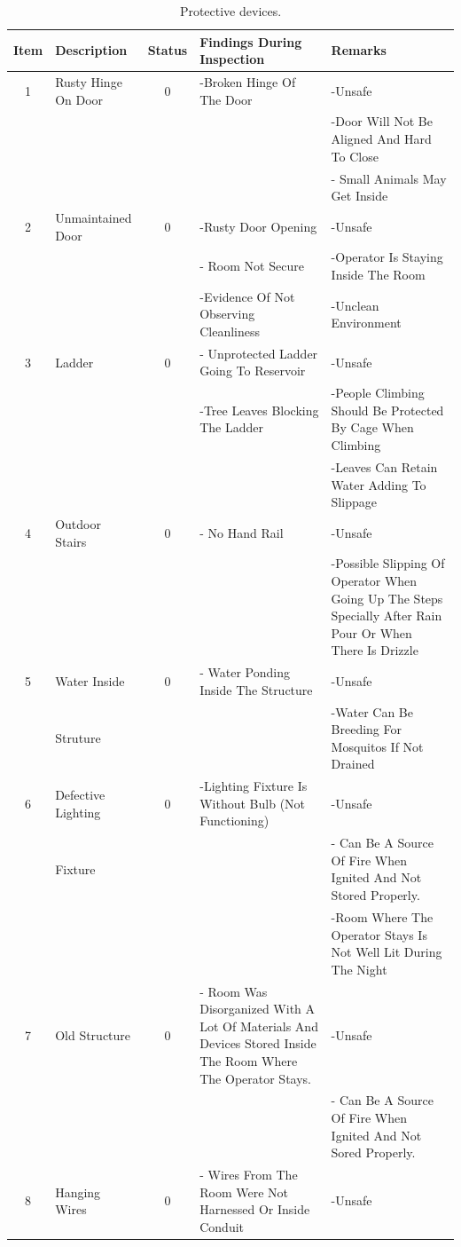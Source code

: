 \begin{table}[!htb]
	\caption{Protective devices.}
	\label{ch05_tbl_fdassafe02}
	{\scriptsize
\begin{tabular}{c|p{1.5cm}|c|p{5cm}|p{5cm}}
	\hline
	Item & Description & Status & Findings During Inspection & Remarks \\ 
	\hline
	1 & Rusty Hinge On Door & 0 & -Broken Hinge Of The Door & -Unsafe \\ 
	&  &  &  & -Door Will Not Be Aligned And Hard To Close \\ 
	&  &  &  & - Small Animals May Get Inside \\ 
	\hline
	2 & Unmaintained Door & 0 & -Rusty Door Opening & -Unsafe \\ 
	&  &  & - Room Not Secure & -Operator Is  Staying Inside The Room  \\ 
	&  &  & -Evidence Of Not Observing Cleanliness & -Unclean Environment \\ 
	\hline
	3 & Ladder & 0 & - Unprotected Ladder Going To Reservoir & -Unsafe \\ 
	&  &  & -Tree Leaves Blocking The Ladder & -People Climbing Should Be Protected By Cage When Climbing \\ 
	&  &  &  & -Leaves Can Retain Water Adding To Slippage \\ 
	\hline
	4 & Outdoor Stairs & 0 & - No Hand Rail  & -Unsafe \\ 
	&  &  &  & -Possible Slipping Of Operator When Going Up The Steps Specially After Rain Pour Or When There Is Drizzle   \\ 
	\hline
	5 & Water Inside & 0 & - Water Ponding Inside The Structure & -Unsafe \\ 
	& Struture &  &  & -Water Can Be Breeding For Mosquitos If Not Drained \\ 
	\hline
	6 & Defective Lighting & 0 & -Lighting Fixture Is Without Bulb (Not Functioning) & -Unsafe \\ 
	& Fixture &  &  & -  Can Be A Source Of Fire When Ignited And Not Stored Properly. \\ 
	&  &  &  & -Room Where The Operator Stays Is Not Well Lit During The Night \\ 
	\hline
	7 & Old Structure & 0 & - Room Was Disorganized With A Lot Of Materials And Devices Stored Inside The Room Where The Operator Stays. & -Unsafe \\ 
	&  &  &  & -  Can Be A Source Of Fire When Ignited And Not Sored Properly. \\ 
	\hline
	8 & Hanging Wires & 0 & - Wires From The Room Were Not Harnessed Or Inside Conduit & -Unsafe \\ 

\end{tabular}}
\end{table}
